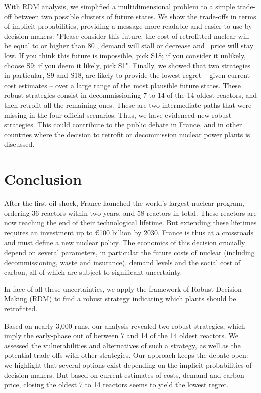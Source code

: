 With RDM analysis, we simplified a multidimensional problem to a simple trade-off between two possible clusters of future states. We show the trade-offs in terms of implicit probabilities, providing a message more readable and easier to use by decision makers: "Please consider this future: the cost of retrofitted nuclear will be equal to or higher than 80 \emwh, demand will stall or decrease and \coo\ price will stay low. If you think this future is impossible, pick S18; if you consider it unlikely, choose S9; if you deem it likely, pick S1". 
Finally, we showed that two strategies in particular, S9 and S18, are likely to provide the lowest regret -- given current cost estimates -- over a large range of the most plausible future states. These robust strategies consist in decommissioning 7 to 14 of the 14 oldest reactors, and then retrofit all the remaining ones. These are two intermediate paths that were missing in the four official scenarios. Thus, we have evidenced new robust strategies. This could contribute to the public debate in France, and in other countries where the decision to retrofit or decommission nuclear power plants is discussed.




\section{Conclusion}
\label{sec:conclusion2}

After the first oil shock, France launched the world’s largest nuclear program, ordering 36 reactors within two years, and 58 reactors in total. These reactors are now reaching the end of their technological lifetime. But extending these lifetimes requires an investment up to \euro 100 billion by 2030. 
France is thus at a crossroads and must define a new nuclear policy. The economics of this decision crucially depend on several parameters, in particular the future costs of nuclear (including decommissioning, waste and insurance), demand levels and the social cost of carbon, all of which are subject to significant uncertainty.

In face of all these uncertainties, we apply the framework of Robust Decision Making (RDM) to find a robust strategy indicating which plants should be retrofitted.

Based on nearly 3,000 runs, our analysis revealed two robust strategies, which imply the early-phase out of between 7 and 14 of the 14 oldest reactors. We assessed the vulnerabilities and alternatives of such a strategy, as well as the potential trade-offs with other strategies. Our approach keeps the debate open: we highlight that several options exist depending on the implicit probabilities of decision-makers. But based on current estimates of costs, demand and carbon price, closing the oldest 7 to 14 reactors seems to yield the lowest regret. 

